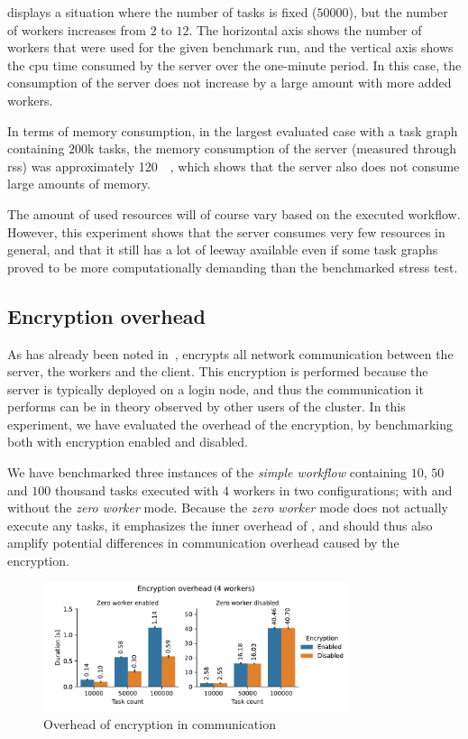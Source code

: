  displays a situation where the number of tasks
is fixed ($50000$), but the number of workers increases from
$2$ to $12$. The horizontal axis shows the number of workers
that were used for the given benchmark run, and the vertical axis shows the \gls{cpu}
time consumed by the server over the one-minute period. In this case, the consumption of the server
does not increase by a large amount with more added workers.

In terms of memory consumption, in the largest evaluated case with a task graph containing
$200$k tasks, the memory consumption of the server (measured through
\gls{rss}) was approximately \SI{120}{\mebi\byte}, which shows that the server
also does not consume large amounts of memory.

The amount of used resources will of course vary based on the executed workflow. However, this
experiment shows that the server consumes very few resources in general, and that it still has a
lot of leeway available even if some task graphs proved to be more computationally demanding than
the benchmarked stress test.

\subsection{Encryption overhead}
\label{sec:hq-exp-encryption-overhead}
As has already been noted in~, \hyperqueue{} encrypts all network
communication between the server, the workers and the client. This encryption is performed because
the server is typically deployed on a login node, and thus the communication it performs can be in
theory observed by other users of the cluster. In this experiment, we have evaluated the overhead
of the encryption, by benchmarking \hyperqueue{} both with encryption enabled and
disabled.

We have benchmarked three instances of the \emph{simple workflow} containing
$10$, $50$ and $100$ thousand tasks
executed with $4$ \hyperqueue{} workers in two configurations; with
and without the \emph{zero worker} mode. Because the \emph{zero worker} mode does not
actually execute any tasks, it emphasizes the inner overhead of \hyperqueue{}, and should
thus also amplify potential differences in communication overhead caused by the encryption.

\begin{figure}[h]
	\centering
	\includegraphics[width=0.8\textwidth]{imgs/hq/charts/encryption-overhead}
	\caption{Overhead of encryption in \hyperqueue{} communication}
	\label{fig:hq-encryption-overhead}
\end{figure}

